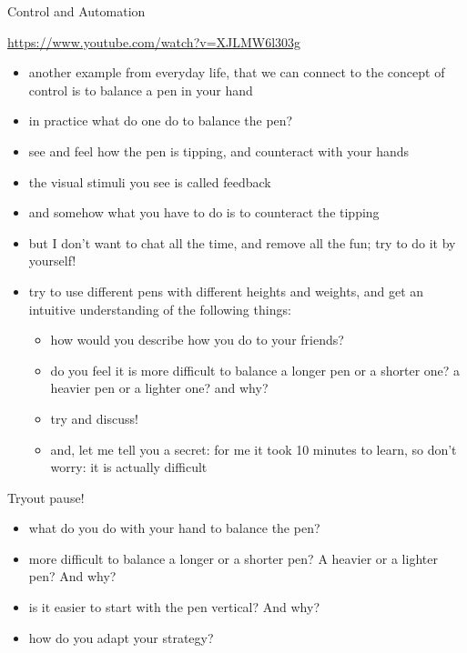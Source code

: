 \begin{frame}{Control and Automation}
	\begin{center}
		\url{https://www.youtube.com/watch?v=XJLMW6l303g} \vspace{0.2cm} \\
	\end{center}
\end{frame}


\begin{frame}
	\begin{itemize}
		\item another example from everyday life, that we can connect to the concept of control is to balance a pen in your hand
		\item in practice what do one do to balance the pen?
		\item see and feel how the pen is tipping, and counteract with your hands
		\item the visual stimuli you see is called feedback 
		\item and somehow what you have to do is to counteract the tipping
		\item but I don't want to chat all the time, and remove all the fun; try to do it by yourself!
		\item try to use different pens with different heights and weights, and get an intuitive understanding of the following things:
			\begin{itemize}
				\item how would you describe how you do to your friends?
				\item do you feel it is more difficult to balance a longer pen or a shorter one? a heavier pen or a lighter one? and why?
				\item try and discuss!
				\item and, let me tell you a secret: for me it took 10 minutes to learn, so don't worry: it is actually difficult
			\end{itemize}
	\end{itemize}
\end{frame}


\begin{frame}{Tryout pause!}
	\begin{itemize}
		\item what do you do with your hand to balance the pen?
		\item more difficult to balance a longer or a shorter pen? A heavier or a lighter pen? And why?
		\item is it easier to start with the pen vertical? And why?
		\item how do you adapt your strategy?
	\end{itemize}
\end{frame}


